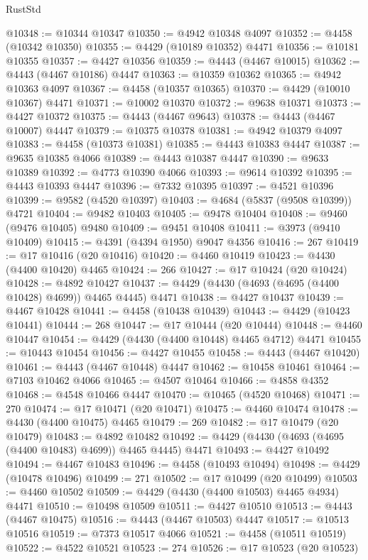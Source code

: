 \begin{lexlean}{RustStd}
\begin{coremodule}
@10348 := @10344 @10347
@10350 := @4942 @10348 @4097
@10352 := @4458 (@10342 @10350)
@10355 := @4429 (@10189 @10352) @4471
@10356 := @10181 @10355
@10357 := @4427 @10356
@10359 := @4443 (@4467 @10015)
@10362 := @4443 (@4467 @10186) @4447
@10363 := @10359 @10362
@10365 := @4942 @10363 @4097
@10367 := @4458 (@10357 @10365)
@10370 := @4429 (@10010 @10367) @4471
@10371 := @10002 @10370
@10372 := @9638 @10371
@10373 := @4427 @10372
@10375 := @4443 (@4467 @9643)
@10378 := @4443 (@4467 @10007) @4447
@10379 := @10375 @10378
@10381 := @4942 @10379 @4097
@10383 := @4458 (@10373 @10381)
@10385 := @4443 @10383 @4447
@10387 := @9635 @10385 @4066
@10389 := @4443 @10387 @4447
@10390 := @9633 @10389
@10392 := @4773 @10390 @4066
@10393 := @9614 @10392
@10395 := @4443 @10393 @4447
@10396 := @7332 @10395
@10397 := @4521 @10396
@10399 := @9582 (@4520 @10397)
@10403 := @4684 (@5837 (@9508 @10399)) @4721
@10404 := @9482 @10403
@10405 := @9478 @10404
@10408 := @9460 (@9476 @10405) @9480
@10409 := @9451 @10408
@10411 := @3973 (@9410 @10409)
@10415 := @4391 (@4394 @1950) @9047 @4356
@10416 := 267
@10419 := @17 @10416 (@20 @10416)
@10420 := @4460 @10419
@10423 := @4430 (@4400 @10420) @4465
@10424 := 266
@10427 := @17 @10424 (@20 @10424)
@10428 := @4892 @10427
@10437 := @4429 (@4430 (@4693 (@4695 (@4400 @10428) @4699)) @4465 @4445) @4471
@10438 := @4427 @10437
@10439 := @4467 @10428
@10441 := @4458 (@10438 @10439)
@10443 := @4429 (@10423 @10441)
@10444 := 268
@10447 := @17 @10444 (@20 @10444)
@10448 := @4460 @10447
@10454 := @4429 (@4430 (@4400 @10448) @4465 @4712) @4471
@10455 := @10443 @10454
@10456 := @4427 @10455
@10458 := @4443 (@4467 @10420)
@10461 := @4443 (@4467 @10448) @4447
@10462 := @10458 @10461
@10464 := @7103 @10462 @4066
@10465 := @4507 @10464
@10466 := @4858 @4352
@10468 := @4548 @10466 @4447
@10470 := @10465 (@4520 @10468)
@10471 := 270
@10474 := @17 @10471 (@20 @10471)
@10475 := @4460 @10474
@10478 := @4430 (@4400 @10475) @4465
@10479 := 269
@10482 := @17 @10479 (@20 @10479)
@10483 := @4892 @10482
@10492 := @4429 (@4430 (@4693 (@4695 (@4400 @10483) @4699)) @4465 @4445) @4471
@10493 := @4427 @10492
@10494 := @4467 @10483
@10496 := @4458 (@10493 @10494)
@10498 := @4429 (@10478 @10496)
@10499 := 271
@10502 := @17 @10499 (@20 @10499)
@10503 := @4460 @10502
@10509 := @4429 (@4430 (@4400 @10503) @4465 @4934) @4471
@10510 := @10498 @10509
@10511 := @4427 @10510
@10513 := @4443 (@4467 @10475)
@10516 := @4443 (@4467 @10503) @4447
@10517 := @10513 @10516
@10519 := @7373 @10517 @4066
@10521 := @4458 (@10511 @10519)
@10522 := @4522 @10521
@10523 := 274
@10526 := @17 @10523 (@20 @10523)

\end{coremodule}
\end{lexlean}
